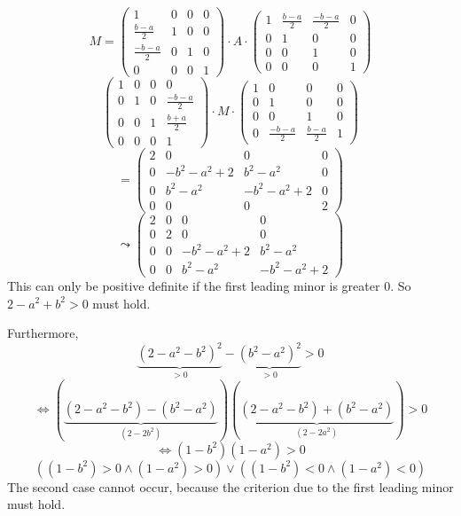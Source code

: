\documentclass[a4paper]{article}
\theoremstyle{definition}
\begin{document}
\[
  M =
  \begin{pmatrix}
    1 & 0 & 0 & 0 \\
    \frac{b-a}{2} & 1 & 0 & 0 \\
    \frac{-b-a}{2} & 0 & 1 & 0 \\
    0 & 0 & 0 & 1
  \end{pmatrix}
  \cdot A \cdot
  \begin{pmatrix}
    1 & \frac{b-a}{2} & \frac{-b-a}{2} & 0 \\
    0 & 1 & 0 & 0 \\
    0 & 0 & 1 & 0 \\
    0 & 0 & 0 & 1
  \end{pmatrix}
\] \[
  \begin{pmatrix}
    1 & 0 & 0 & 0 \\
    0 & 1 & 0 & \frac{-b-a}{2} \\
    0 & 0 & 1 & \frac{b+a}{2} \\
    0 & 0 & 0 & 1
  \end{pmatrix}
  \cdot M \cdot
  \begin{pmatrix}
    1 & 0 & 0 & 0 \\
    0 & 1 & 0 & 0 \\
    0 & 0 & 1 & 0 \\
    0 & \frac{-b-a}{2} & \frac{b-a}{2} & 1
  \end{pmatrix}
\] \[
  = \begin{pmatrix}
    2 & 0 & 0 & 0 \\
    0 & -b^2 - a^2 + 2 & b^2 - a^2 & 0 \\
    0 & b^2-a^2 & -b^2 - a^2 + 2 & 0 \\
    0 & 0 & 0 & 2
  \end{pmatrix}
\] \[
  \leadsto
  \begin{pmatrix}
    2 & 0 & 0 & 0 \\
    0 & 2 & 0 & 0 \\
    0 & 0 & -b^2 - a^2 + 2 & b^2 - a^2 \\
    0 & 0 & b^2-a^2 & -b^2 - a^2 + 2
  \end{pmatrix}
\]
This can only be positive definite if the first leading minor is greater $0$.
So $2 - a^2 + b^2 > 0$ must hold.

Furthermore,
\[ \underbrace{(2 - a^2 - b^2)^2}_{>0} - \underbrace{(b^2 - a^2)^2}_{> 0} > 0 \]
\[ \Leftrightarrow (\underbrace{(2 - a^2 - b^2) - (b^2 - a^2)}_{(2 - 2b^2)})(\underbrace{(2 - a^2 - b^2) + (b^2 - a^2)}_{(2 - 2a^2)}) > 0 \]
\[ \Leftrightarrow (1 - b^2)(1 - a^2) > 0 \]
\[ ((1 - b^2) > 0 \land (1 - a^2) > 0) \lor ((1 - b^2) < 0 \land (1 - a^2) < 0) \]
The second case cannot occur, because the criterion due to the first leading minor must hold.
\end{document}
